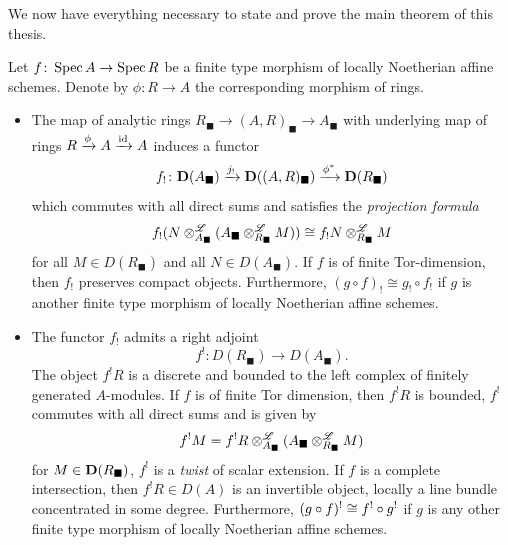 We now have everything necessary to state and prove the main theorem of this thesis.
\begin{theorem}
	\label{theorem: exceptional direct and inverse image functors, the affine case}
	
	Let $f\colon \operatorname{Spec} A\to\operatorname{Spec} R$ be a finite type morphism of locally Noetherian affine schemes. Denote by $\phi\colon R\to A$ the corresponding morphism of rings.
	\begin{itemize}
		\item
		The map of analytic rings $R_\blacksquare\to (A, R)_\blacksquare \to A_\blacksquare$ with underlying map of rings $R\xrightarrow{\phi} A\xrightarrow{\mathrm{id}}A$ induces a functor
		$$f_!\colon {{\mathbf{D}}(A_\blacksquare)} \xrightarrow{j_!} {{\mathbf{D}}((A, R)_\blacksquare)}\xrightarrow{{\phi^\ast}} {{\mathbf{D}}(R_\blacksquare)}$$
		which commutes with all direct sums and satisfies the \emph{projection formula}
		$$f_!(N \otimes^{\mathscr{L}}_{A_\blacksquare} (A_\blacksquare\otimes^{\mathscr{L}}_{R_\blacksquare} M)) \cong f_!N\otimes^{\mathscr{L}}_{R_\blacksquare} M$$
		for all $M\in D(R_\blacksquare)$ and all $N\in D(A_\blacksquare)$. If $f$ is of finite Tor-dimension, then $f_!$ preserves compact objects. Furthermore, $(g\circ f)_! \cong g_!\circ f_!$ if $g$ is another finite type morphism of locally Noetherian affine schemes.
		
		\item
		The functor $f_!$ admits a right adjoint
		$$f^!\colon D(R_\blacksquare)\to D(A_\blacksquare).$$
		The object $f^!R$ is a discrete and bounded to the left complex of finitely generated $A$-modules. If $f$ is of finite Tor dimension, then $f^!R$ is bounded, $f^!$ commutes with all direct sums and is given by
			$$f^!M =  f^!R \otimes^{\mathscr{L}}_{A_\blacksquare} (A_\blacksquare \otimes^{\mathscr{L}}_{R_\blacksquare} M)$$
		for $M\in{{\mathbf{D}}(R_\blacksquare)}$, \ie $f^!$ is a \emph{twist} of scalar extension. If $f$ is a complete intersection, then $f^!R\in D(A)$ is an invertible object, \ie locally a line bundle concentrated in some degree. Furthermore, $(g\circ f)^! \cong f^!\circ g^!$ if $g$ is any other finite type morphism of locally Noetherian affine schemes.
	\end{itemize}
\end{theorem}
